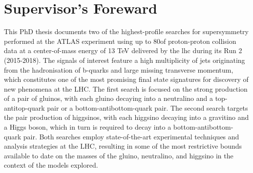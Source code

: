 \chapter*{Supervisor's Foreward}

This PhD thesis documents two of the highest-profile searches for supersymmetry performed at the ATLAS experiment using up to 80\ifb of proton-proton collision data at a center-of-mass energy of 13 TeV delivered by the \gls{lhc} during its Run 2 (2015-2018). 
The signals of interest feature a high multiplicity of jets originating from the hadronisation of b-quarks and large missing transverse momentum, 
which constitutes one of the most promising final state signatures for discovery of new phenomena at the LHC. 
The first search is focused on the strong production of a pair of gluinos, 
with each gluino decaying into a neutralino and a top-antitop-quark pair or a bottom-antibottom-quark pair. 
The second search targets the pair production of higgsinos, 
with each higgsino decaying into a gravitino and a Higgs boson, 
which in turn is required to decay into a bottom-antibottom-quark pair. 
Both searches employ state-of-the-art experimental techniques and analysis strategies at the LHC, 
resulting in some of the most restrictive bounds available to date on the masses of the gluino, 
neutralino, 
and higgsino in the context of the models explored.
